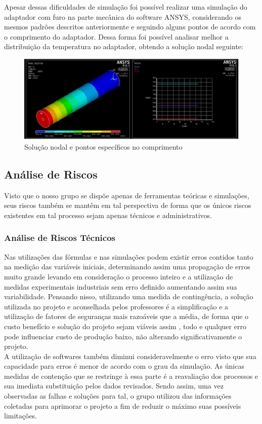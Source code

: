 Apesar dessas dificuldades de simulação foi possível realizar uma simulação do adaptador com furo na parte mecânica do software ANSYS, considerando os mesmos padrões descritos anteriormente e seguindo alguns pontos de acordo com o comprimento do adaptador. Dessa forma foi possível analisar melhor a distribuição da temperatura no adaptador, obtendo a solução nodal seguinte: 
\begin{figure}[!htb]                  
	\centering                          
	\includegraphics[scale=0.8]{figuras/Figura12tc.eps}
	\caption{Solução nodal e pontos específicos no comprimento} \label{fig12tc}              
\end{figure}
\subsection{Análise de Riscos}
Visto que o nosso grupo se dispõe apenas de ferramentas teóricas e simulações, seus riscos também se mantêm em tal perspectiva de forma que os únicos riscos existentes em tal processo sejam apenas técnicos e administrativos.
\subsubsection{Análise de Riscos Técnicos}
Nas utilizações das fórmulas e nas simulações podem existir erros contidos tanto na medição das variáveis iniciais, determinando assim uma propagação de erros muito grande levando em consideração o processo inteiro e a utilização de medidas experimentais industriais sem erro definido aumentando assim sua variabilidade. Pensando nisso, utilizando uma medida de contingência, a solução utilizada no projeto e aconselhada pelos professores é a simplificação e a utilização de fatores de seguranças mais razoáveis que a média, de forma que o custo benefício e solução do projeto sejam viáveis assim , todo e qualquer erro pode influenciar custo de produção baixo, não alterando significativamente o projeto. \\
A utilização de softwares também diminui consideravelmente o erro visto que sua capacidade para erros é menor de acordo com o grau da simulação. As únicas medidas de contenção que se restringe à essa parte é a reavaliação dos processos e sua imediata substituição pelos dados revisados. Sendo assim, uma vez observadas as falhas e soluções para tal, o grupo utilizou das informações coletadas para aprimorar o projeto a fim de reduzir o máximo suas possíveis limitações.
